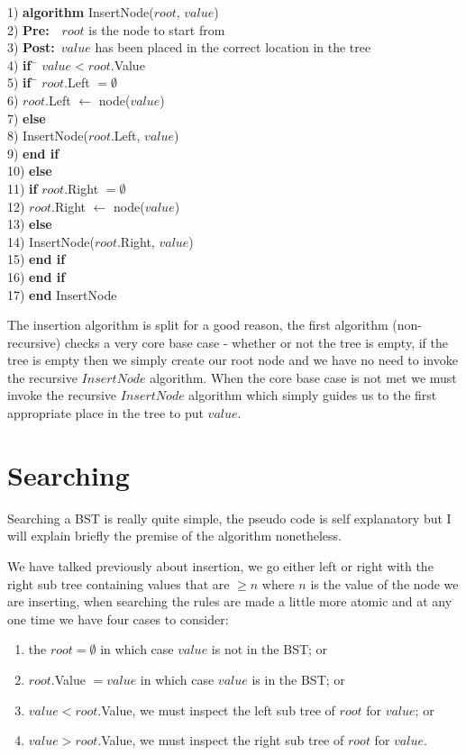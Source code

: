 \newpage
\begin{tabbing}
1)  \textbf{alg}\= \textbf{orithm} InsertNode($root$, $value$) \\
2)  \> \textbf{Pre:}~~$root$ is the node to start from \\
3)  \> \textbf{Post:}~$value$ has been placed in the correct location in the tree \\
4)  \> \textbf{if}~\= $value < root$.Value \\
5)  \> \> \textbf{if}~\= $root$.Left $= \emptyset$ \\
6)  \> \> \> $root$.Left $\leftarrow$ node($value$) \\
7)  \> \> \textbf{else} \\
8)  \> \> \> InsertNode($root$.Left, $value$) \\
9)  \> \> \textbf{end if} \\
10) \> \textbf{else} \\
11) \> \> \textbf{if} $root$.Right $= \emptyset$ \\
12) \> \> \> $root$.Right $\leftarrow$ node($value$) \\
13) \> \> \textbf{else} \\
14) \> \> \> InsertNode($root$.Right, $value$) \\
15) \> \> \textbf{end if} \\
16) \> \textbf{end if} \\
17) \textbf{end} InsertNode \\ 
\end{tabbing}

The insertion algorithm is split for a good reason, the first algorithm (non-recursive) checks a very core base case - whether or not the tree is empty, if the tree is empty then we simply create our root node and we have no need to invoke the recursive $InsertNode$ algorithm. When the core base case is not met we must invoke the recursive $InsertNode$ algorithm which simply guides us to the first appropriate place in the tree to put $value$.

\section{Searching}
Searching a BST is really quite simple, the pseudo code is self explanatory but I will explain briefly the premise of the algorithm nonetheless.

We have talked previously about insertion, we go either left or right with the right sub tree containing values that are $\geq n$ where $n$ is the value of the node we are inserting, when searching the rules are made a little more atomic and at any one time we have four cases to consider: 
\begin{enumerate}
\item the $root = \emptyset$ in which case $value$ is not in the BST; or
\item $root$.Value $= value$ in which case $value$ is in the BST; or
\item $value < root$.Value, we must inspect the left sub tree of $root$ for $value$; or
\item $value > root$.Value, we must inspect the right sub tree of $root$ for $value$.
\end{enumerate}

